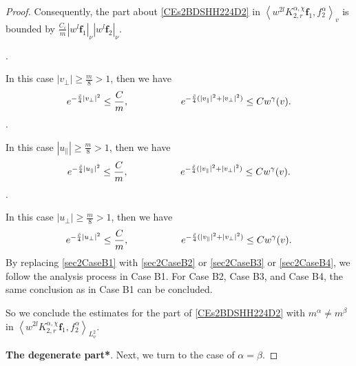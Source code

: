 \documentclass[reqno]{amsart}
\numberwithin{equation}{section}
\numberwithin{equation}{section}
\begin{document}
\begin{proof}
		Consequently, the  part about \eqref{CEs2BDSHH224D2} in $\left \langle  w^{2l}K_{2,r}^{\alpha,\chi}\mathbf{f}_1,f^{\alpha}_2\right \rangle_v$ is bounded by $\frac{C_{\varepsilon}}{m} |w^{l} \mathbf{f}_1|_\nu |w^{l} \mathbf{f}_2|_\nu$.
		
		
		
		
		.
		
		In this case $|v_{\perp}|\geq \frac{m}{8}>1$, then we have 
		\begin{equation}\label{sec2CaseB2}
			e^{-\frac{\bar{c}}{4}|v_{\perp}|^2} \leq \frac{C}{m}, \hspace{1.9cm} e^{-\frac{\bar{c}}{4}(|v_{\parallel}|^2+|v_{\perp}|^2)} \leq C w^{\gamma}(v).
		\end{equation}
		.
		
		In this case $|u_{\parallel}|\geq \frac{m}{8}>1$, then we have 
		\begin{equation}\label{sec2CaseB3}
			e^{-\frac{\bar{c}}{4}|u_{\parallel}|^2} \leq \frac{C}{m}, \hspace{1.9cm} e^{-\frac{\bar{c}}{4}(|v_{\parallel}|^2+|v_{\perp}|^2)} \leq C w^{\gamma}(v).
		\end{equation}
		.
		
		In this case $|u_{\perp}|\geq \frac{m}{8}>1$, then we have 
		\begin{equation}\label{sec2CaseB4}
			e^{-\frac{\bar{c}}{4}|u_{\perp}|^2} \leq \frac{C}{m}, \hspace{1.9cm} e^{-\frac{\bar{c}}{4}(|v_{\parallel}|^2+|v_{\perp}|^2)} \leq C w^{\gamma}(v).
		\end{equation}
		By replacing \eqref{sec2CaseB1} with \eqref{sec2CaseB2} or \eqref{sec2CaseB3} or \eqref{sec2CaseB4}, we follow the analysis process in Case B1. For Case B2, Case B3, and Case B4, the same conclusion as in Case B1 can be concluded.
		
		So we conclude the estimates for the part of \eqref{CEs2BDSHH224D2} with $m^{\alpha}\neq m^{\beta}$ in $\left \langle  w^{2l}K_{2,r}^{\alpha,\chi}\mathbf{f}_1,f^{\alpha}_2\right \rangle_{L^{2}_{v}}$.
		
	\noindent\textbf{The degenerate part*}.\hspace{0.1cm}	Next, we turn to the case of $\alpha=\beta$.
		

\end{proof}
\end{document}
